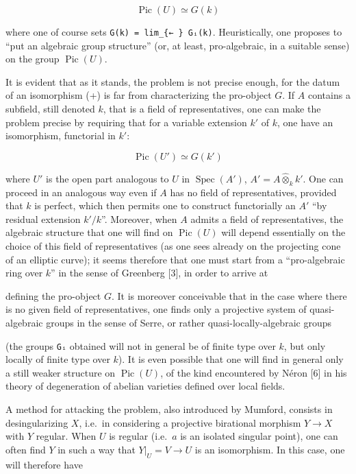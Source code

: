 \documentclass[
]{article}
\begin{document}
\[
\operatorname{Pic}(U) \simeq G(k)
\]

where one of course sets \texttt{G(k)\ =\ lim\_\{←\ \}\ Gᵢ(k)}.
Heuristically, one proposes to ``put an algebraic group structure'' (or,
at least, pro-algebraic, in a suitable sense) on the group
\(\operatorname{Pic}(U)\).

It is evident that as it stands, the problem is not precise enough, for
the datum of an isomorphism (+) is far from characterizing the
pro-object \(G\). If \(A\) contains a subfield, still denoted \(k\),
that is a field of representatives, one can make the problem precise by
requiring that for a variable extension \(k'\) of \(k\), one have an
isomorphism, functorial in \(k'\):

\[
\operatorname{Pic}(U') \simeq G(k')
\]

where \(U'\) is the open part analogous to \(U\) in
\(\operatorname{Spec}(A')\), \(A' = A \hat{\otimes}_{k} k'\). One can
proceed in an analogous way even if \(A\) has no field of
representatives, provided that \(k\) is perfect, which then permits one
to construct functorially an \(A'\) ``by residual extension \(k'/k\)''.
Moreover, when \(A\) admits a field of representatives, the algebraic
structure that one will find on \(\operatorname{Pic}(U)\) will depend
essentially on the choice of this field of representatives (as one sees
already on the projecting cone of an elliptic curve); it seems therefore
that one must start from a ``pro-algebraic ring over \(k\)'' in the
sense of Greenberg {[}3{]}, in order to arrive at

defining the pro-object \(G\). It is moreover conceivable that in the
case where there is no given field of representatives, one finds only a
projective system of quasi-algebraic groups in the sense of Serre, or
rather quasi-locally-algebraic groups

(the groups \texttt{Gᵢ} obtained will not in general be of finite type
over \(k\), but only locally of finite type over \(k\)). It is even
possible that one will find in general only a still weaker structure on
\(\operatorname{Pic}(U)\), of the kind encountered by Néron {[}6{]} in
his theory of degeneration of abelian varieties defined over local
fields.

A method for attacking the problem, also introduced by Mumford, consists
in desingularizing \(X\), i.e.~in considering a projective birational
morphism \(Y \to X\) with \(Y\) regular. When \(U\) is regular
(i.e.~\(a\) is an isolated singular point), one can often find \(Y\) in
such a way that \(Y|_{U} = V \to U\) is an isomorphism. In this case,
one will therefore have
\end{document}
